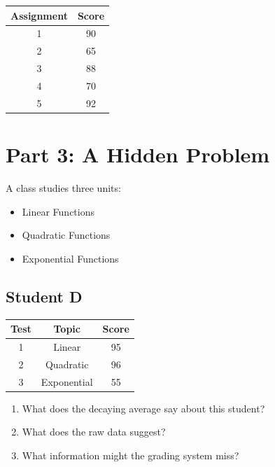 \documentclass[12pt]{article}
\begin{document}
\begin{center}
\begin{tabular}{cc}
\toprule
Assignment & Score \\
\midrule
1 & 90 \\
2 & 65 \\
3 & 88 \\
4 & 70 \\
5 & 92 \\
\bottomrule
\end{tabular}
\end{center}

\vspace{1cm}

\section*{Part 3: A Hidden Problem}

A class studies three units:
\begin{itemize}
    \item Linear Functions
    \item Quadratic Functions
    \item Exponential Functions
\end{itemize}

\subsection*{Student D}

\begin{center}
\begin{tabular}{ccc}
\toprule
Test & Topic & Score \\
\midrule
1 & Linear & 95 \\
2 & Quadratic & 96 \\
3 & Exponential & 55 \\
\bottomrule
\end{tabular}
\end{center}

\begin{enumerate}
    \item What does the decaying average say about this student?
    \vspace{1.5cm}
    
    \item What does the raw data suggest?
    \vspace{1.5cm}
    
    \item What information might the grading system miss?
    \vspace{1.5cm}
\end{enumerate}
\end{document}
